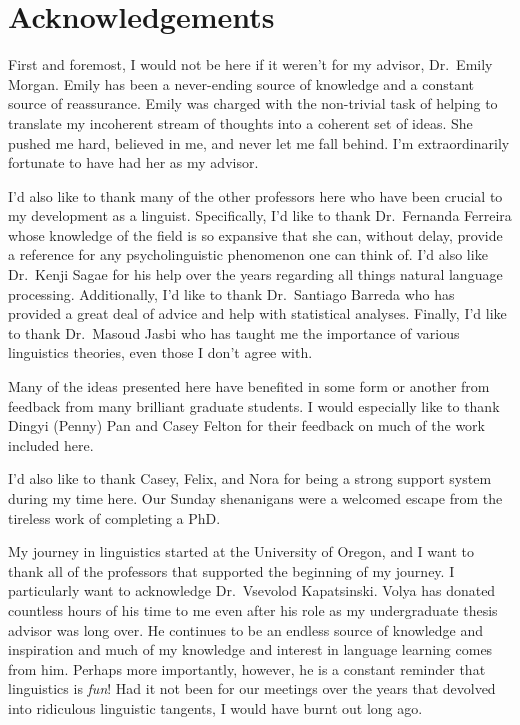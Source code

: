 \documentclass[
  12pt,
  letterpaper,
]{scrreprt}
\renewcommand*\contentsname{Table of contents}
\newcommand\contentsname{Table of contents}
\begin{document}
\setcounter{page}{\value{savedpage}} %
\clearpage
\renewcommand*\contentsname{Table of contents}
{
\setcounter{tocdepth}{2}
\tableofcontents
}
\listoffigures
\listoftables


\chapter*{Acknowledgements}\label{sec-acknowledgements}


First and foremost, I would not be here if it weren't for my advisor,
Dr.~Emily Morgan. Emily has been a never-ending source of knowledge and
a constant source of reassurance. Emily was charged with the non-trivial
task of helping to translate my incoherent stream of thoughts into a
coherent set of ideas. She pushed me hard, believed in me, and never let
me fall behind. I'm extraordinarily fortunate to have had her as my
advisor.

I'd also like to thank many of the other professors here who have been
crucial to my development as a linguist. Specifically, I'd like to thank
Dr.~Fernanda Ferreira whose knowledge of the field is so expansive that
she can, without delay, provide a reference for any psycholinguistic
phenomenon one can think of. I'd also like Dr.~Kenji Sagae for his help
over the years regarding all things natural language processing.
Additionally, I'd like to thank Dr.~Santiago Barreda who has provided a
great deal of advice and help with statistical analyses. Finally, I'd
like to thank Dr.~Masoud Jasbi who has taught me the importance of
various linguistics theories, even those I don't agree with.

Many of the ideas presented here have benefited in some form or another
from feedback from many brilliant graduate students. I would especially
like to thank Dingyi (Penny) Pan and Casey Felton for their feedback on
much of the work included here.

I'd also like to thank Casey, Felix, and Nora for being a strong support
system during my time here. Our Sunday shenanigans were a welcomed
escape from the tireless work of completing a PhD.

My journey in linguistics started at the University of Oregon, and I
want to thank all of the professors that supported the beginning of my
journey. I particularly want to acknowledge Dr.~Vsevolod Kapatsinski.
Volya has donated countless hours of his time to me even after his role
as my undergraduate thesis advisor was long over. He continues to be an
endless source of knowledge and inspiration and much of my knowledge and
interest in language learning comes from him. Perhaps more importantly,
however, he is a constant reminder that linguistics is \emph{fun}! Had
it not been for our meetings over the years that devolved into
ridiculous linguistic tangents, I would have burnt out long ago.
\end{document}
